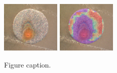 \documentclass[3p]{elsarticle}
\begin{document}
\begin{figure}[H]
\includegraphics[width=0.25\textwidth]{img1.png}
\hspace{2cm}
\includegraphics[width=0.25\textwidth]{img2.png}

\caption{Figure caption.}
\label{fig:deconvolution}
\end{figure}



\end{document}
